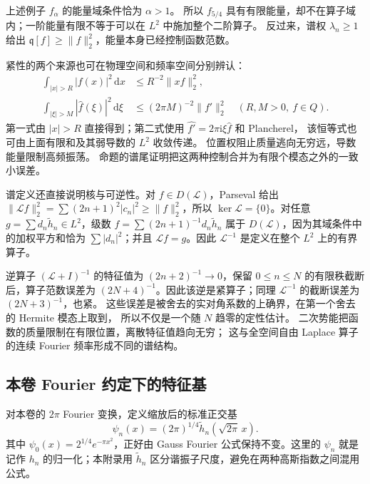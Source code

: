上述例子 \(f_\alpha\) 的能量域条件恰为 \(\alpha>1\)。
所以 \(f_{5/4}\) 具有有限能量，却不在算子域内；一阶能量有限不等于可以在 \(L^2\) 中施加整个二阶算子。
反过来，谱权 \(\lambda_n\geq1\) 给出
\(\mathfrak q[f]\geq\|f\|_2^2\)，能量本身已经控制函数范数。

\ProseParagraphBreak
紧性的两个来源也可在物理空间和频率空间分别辨认：
\[
 \begin{aligned}
 \int_{|x|>R}|f(x)|^2\,\mathrm dx
 &\leq R^{-2}\|xf\|_2^2,\\
 \int_{|\xi|>M}|\widehat f(\xi)|^2\,\mathrm d\xi
 &\leq(2\pi M)^{-2}\|f'\|_2^2
 \quad(R,M>0,\ f\in Q).
 \end{aligned}
\]
第一式由 \(|x|>R\) 直接得到；第二式使用
\(\widehat{f'}=2\pi\mathrm i\xi\widehat f\) 和 Plancherel，
该恒等式也可由上面有限和及其弱导数的 \(L^2\) 收敛传递。
位置权阻止质量逃向无穷远，导数能量限制高频振荡。
命题的谱尾证明把这两种控制合并为有限个模态之外的一致小误差。

\ProseParagraphBreak
谱定义还直接说明核与可逆性。对 \(f\in D(\mathcal L)\)，Parseval 给出
\(\|\mathcal Lf\|_2^2=\sum(2n+1)^2|c_n|^2\ge\|f\|_2^2\)，所以 \(\ker\mathcal L=\{0\}\)。对任意 \(g=\sum d_n\widetilde h_n\in L^2\)，级数
\(f=\sum (2n+1)^{-1}d_n\widetilde h_n\) 属于 \(D(\mathcal L)\)，因为其域条件中的加权平方和恰为 \(\sum|d_n|^2\)；并且 \(\mathcal Lf=g\)。因此 \(\mathcal L^{-1}\) 是定义在整个 \(L^2\) 上的有界算子。

\ProseParagraphBreak
逆算子 \((\mathcal L+I)^{-1}\) 的特征值为 \((2n+2)^{-1}\to0\)，保留 \(0\le n\le N\) 的有限秩截断后，算子范数误差为 \((2N+4)^{-1}\)。因此该逆是紧算子；同理 \(\mathcal L^{-1}\) 的截断误差为 \((2N+3)^{-1}\)，也紧。
这些误差是被舍去的实对角系数的上确界，在第一个舍去的 Hermite 模态上取到，
所以不仅是一个随 \(N\) 趋零的定性估计。
二次势能把函数的质量限制在有限位置，离散特征值趋向无穷；
这与全空间自由 Laplace 算子的连续 Fourier 频率形成不同的谱结构。

\subsection{本卷 Fourier 约定下的特征基}
\label{b2:subsec:B20103}

对本卷的 \(2\pi\) Fourier 变换，定义缩放后的标准正交基
\[\psi_n(x)=(2\pi)^{1/4}\widetilde h_n(\sqrt{2\pi}\,x).\]
其中 \(\psi_0(x)=2^{1/4}e^{-\pi x^2}\)，正好由 Gauss Fourier 公式保持不变。这里的 \(\psi_n\) 就是记作 \(h_n\) 的归一化；本附录用 \(\widetilde h_n\) 区分谐振子尺度，避免在两种高斯指数之间混用公式。

